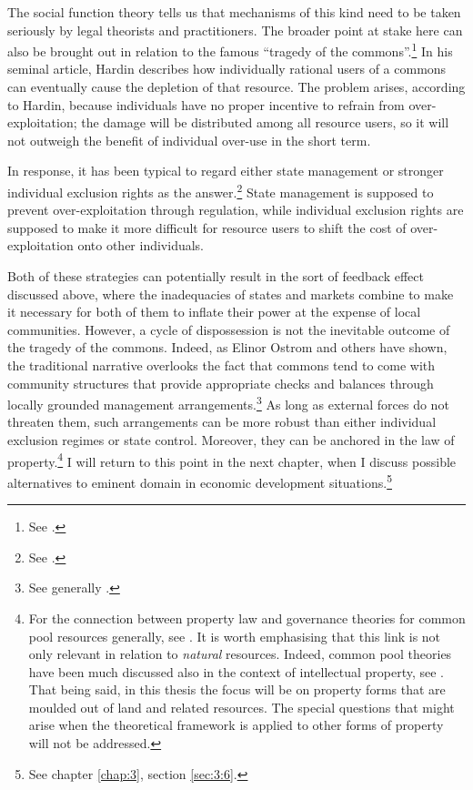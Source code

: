 The social function theory tells us that mechanisms of this kind need to be taken seriously by legal theorists and practitioners. The broader point at stake here can also be brought out in relation to the famous ``tragedy of the commons''.\footnote{See \cite{hardin68}.} In his seminal article, Hardin describes how individually rational users of a commons can eventually cause the depletion of that resource. The problem arises, according to Hardin, because individuals have no proper incentive to refrain from over-exploitation; the damage will be distributed among all resource users, so it will not outweigh the benefit of individual over-use in the short term.


In response, it has been typical to regard either state management or stronger individual exclusion rights as the answer.\footnote{See \cite[8-13]{ostrom90}.} State management is supposed to prevent over-exploitation through regulation, while individual exclusion rights are supposed to make it more difficult for resource users to shift the cost of over-exploitation onto other individuals.

Both of these strategies can potentially result in the sort of feedback effect discussed above, where the inadequacies of states and markets combine to make it necessary for both of them to inflate their power at the expense of local communities. However, a cycle of dispossession is not the inevitable outcome of the tragedy of the commons. Indeed, as Elinor Ostrom and others have shown, the traditional narrative overlooks the fact that commons tend to come with community structures that provide appropriate checks and balances through locally grounded management arrangements.\footnote{See generally \cite{ostrom90}.} As long as external forces do not threaten them, such arrangements can be more robust than either individual exclusion regimes or state control. Moreover, they can be anchored in the law of property.\footnote{For the connection between property law and governance theories for common pool resources generally, see \cite{rose11,fennel11}. It is worth emphasising that this link is not only relevant in relation to {\it natural} resources. Indeed, common pool theories have been much discussed also in the context of intellectual property, see \cite[38-43]{rose11}. That being said, in this thesis the focus will be on property forms that are moulded out of land and related resources. The special questions that might arise when the theoretical framework is applied to other forms of property will not be addressed.} I will return to this point in the next chapter, when I discuss possible alternatives to eminent domain in economic development situations.\footnote{See chapter \ref{chap:3}, section \ref{sec:3:6}.}

